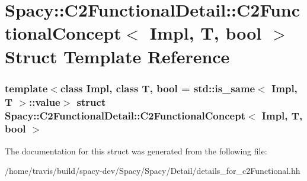 \hypertarget{structSpacy_1_1C2FunctionalDetail_1_1C2FunctionalConcept}{\section{\-Spacy\-:\-:\-C2\-Functional\-Detail\-:\-:\-C2\-Functional\-Concept$<$ \-Impl, \-T, bool $>$ \-Struct \-Template \-Reference}
\label{structSpacy_1_1C2FunctionalDetail_1_1C2FunctionalConcept}
}
\subsubsection*{template$<$class Impl, class T, bool = std\-::is\-\_\-same$<$ Impl, T $>$\-::value$>$ struct Spacy\-::\-C2\-Functional\-Detail\-::\-C2\-Functional\-Concept$<$ Impl, T, bool $>$}



\-The documentation for this struct was generated from the following file\-:\begin{DoxyCompactItemize}
\item 
/home/travis/build/spacy-\/dev/\-Spacy/\-Spacy/\-Detail/details\-\_\-for\-\_\-c2\-Functional.\-hh\end{DoxyCompactItemize}
